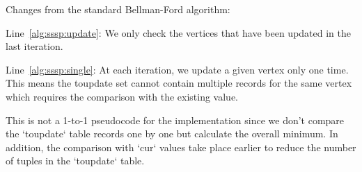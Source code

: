 Changes from the standard Bellman-Ford algorithm:

\begin{description}
\item Line~\ref{alg:sssp:update}: We only check the vertices that have been updated in the last iteration.
\item Line~\ref{alg:sssp:single}: At each iteration, we update a given vertex only one time. This means the toupdate set cannot contain multiple records for the same vertex which requires the comparison with the existing value.
\end{description}

This is not a 1-to-1 pseudocode for the implementation since we don't compare the `toupdate` table records one by one but calculate the overall minimum. In addition, the comparison with `cur` values take place earlier to reduce the number of tuples in the `toupdate` table.

